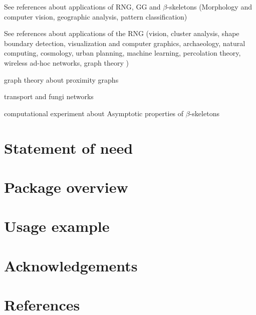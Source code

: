 \documentclass{article}
\begin{document}
See references about applications of RNG, GG and $\beta$-skeletons (Morphology and computer vision, geographic analysis, pattern classification) \cite{Jaromczyk2002}

See references about applications of the RNG (vision, cluster analysis, shape boundary detection, visualization and computer graphics, archaeology, natural computing, cosmology, urban planning, machine learning, percolation theory, wireless ad-hoc networks, graph theory ) \cite{Toussaint2014RNG}

graph theory about proximity graphs \cite{Cimikowski1992, Bose2012}

transport and fungi networks \cite{Adamatzky2011}

computational experiment about Asymptotic properties of $\beta$-skeletons \cite{Adamatzky2014, Alonso2019}

\section*{Statement of need}




\section*{Package overview}

\section*{Usage example}


\section*{Acknowledgements}


\section*{References}



\end{document}
